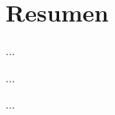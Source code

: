 %
%
%
%
%

\chapter{Resumen}

\begin{FraseCelebre}
\begin{Frase}
...
\end{Frase}
\begin{Fuente}
...
\end{Fuente}
\end{FraseCelebre}

...

\endinput
